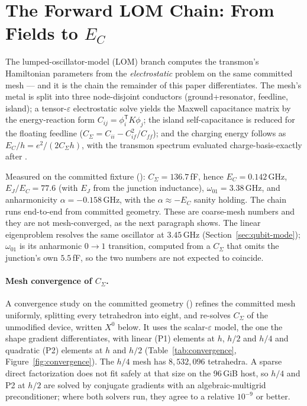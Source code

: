 \documentclass{anvil-paper}
\begin{document}
\section{The Forward LOM Chain: From Fields to \texorpdfstring{$E_C$}{E\_C}}
\label{sec:lom}

The lumped-oscillator-model (LOM) branch computes the transmon's
Hamiltonian parameters from the \emph{electrostatic} problem on the same
committed mesh --- and it is the chain the remainder of this paper
differentiates. The mesh's metal is split into three node-disjoint
conductors (ground+resonator, feedline, island); a tensor-$\varepsilon$
electrostatic solve yields the Maxwell capacitance matrix by the
energy-reaction form $C_{ij} = \phi_i^{\mathsf{T}} K \phi_j$; the island
self-capacitance is reduced for the floating feedline
($C_\Sigma = C_{ii} - C_{if}^2/C_{ff}$); and the charging energy follows
as $E_C/h = e^2/(2 C_\Sigma h)$, with the transmon spectrum evaluated
charge-basis-exactly after \citet{koch2007}.

Measured on the committed fixture
(): $C_\Sigma =
136.7$\,fF, hence $E_C = 0.142$\,GHz, $E_J/E_C = 77.6$ (with $E_J$ from
the junction inductance), $\omega_{01} = 3.38$\,GHz, and anharmonicity
$\alpha = -0.158$\,GHz, with the $\alpha \approx -E_C$ sanity holding.
The chain runs end-to-end from committed geometry. These are
coarse-mesh numbers and they are not mesh-converged, as the next
paragraph shows. The linear eigenproblem
resolves the same oscillator at $3.45$\,GHz
(Section~\ref{sec:qubit-mode}); $\omega_{01}$ is its anharmonic
$0 \to 1$ transition, computed from a $C_\Sigma$ that omits the
junction's own $5.5$\,fF, so the two numbers are not expected to
coincide.

\paragraph{Mesh convergence of $C_\Sigma$.}
A convergence study on the committed geometry
() refines
the committed mesh uniformly, splitting every tetrahedron into eight,
and re-solves $C_\Sigma$ of the unmodified device, written $X^0$ below.
It uses the scalar-$\varepsilon$ model, the one the shape gradient
differentiates, with linear (P1) elements at $h$, $h/2$ and $h/4$ and
quadratic (P2) elements at $h$ and $h/2$
(Table~\ref{tab:convergence}, Figure~\ref{fig:convergence}). The $h/4$
mesh has $8{,}532{,}096$ tetrahedra. A sparse direct factorization does
not fit safely at that size on the 96\,GiB host, so $h/4$ and P2 at
$h/2$ are solved by conjugate gradients with an algebraic-multigrid
preconditioner; where both solvers run, they agree to a relative
$10^{-9}$ or better.
\end{document}

